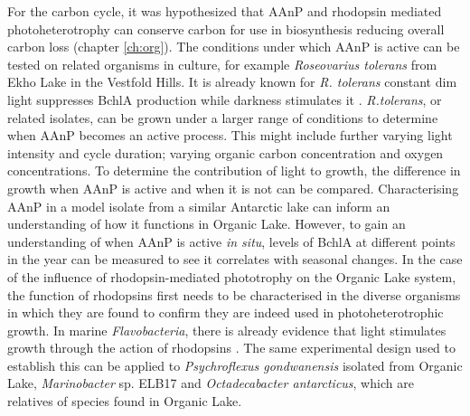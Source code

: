For the carbon cycle, it was hypothesized that \ac{AAnP} and rhodopsin mediated photoheterotrophy can conserve carbon for use in biosynthesis  reducing overall carbon loss (chapter \ref{ch:org}).
The conditions under which \ac{AAnP} is active can be tested on related organisms in culture, for example \emph{Roseovarius tolerans} from Ekho Lake in the Vestfold Hills. 
It is already known for \emph{R. tolerans} constant dim light suppresses \ac{BchlA} production while darkness stimulates it \cite{Labrenz1999}.
\emph{R.tolerans}, or related isolates, can be grown under a larger range of conditions to determine when \ac{AAnP} becomes an active process.
This might include further varying light intensity and cycle duration; varying organic carbon concentration and oxygen concentrations.
To determine the contribution of light to growth, the difference in growth when \ac{AAnP} is active and when it is not can be compared.
Characterising \ac{AAnP} in a model isolate from a similar Antarctic lake can inform an understanding of how it functions in Organic Lake.
However, to gain an understanding of when \ac{AAnP} is active \emph{in situ}, levels of \ac{BchlA} at different points in the year can be measured to see it correlates with seasonal changes.
In the case of the influence of rhodopsin-mediated phototrophy on the Organic Lake system, the function of rhodopsins first needs to be characterised in the diverse organisms in which they are found to confirm they are indeed used in photoheterotrophic growth.
In marine \emph{Flavobacteria}, there is already evidence that light stimulates growth through the action of rhodopsins \cite{Gomez-Consarnau2007}.
The same experimental design used to establish this can be applied to \emph{Psychroflexus gondwanensis} isolated from Organic Lake, \emph{Marinobacter} sp. ELB17 and \emph{Octadecabacter antarcticus}, which are relatives of species found in Organic Lake.

